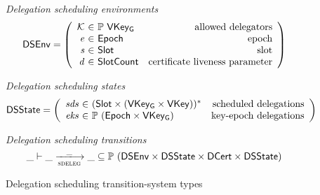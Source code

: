 \begin{figure}[htb]
  \emph{Delegation scheduling environments}
  \begin{equation*}
    \DSEnv =
    \left(
      \begin{array}{r@{~\in~}lr}
        \mathcal{K} & \powerset{\VKeyGen} & \text{allowed delegators}\\
        \var{e} & \Epoch & \text{epoch}\\
        \var{s} & \Slot & \text{slot}\\
        \var{d} & \SlotCount & \text{certificate liveness parameter}
      \end{array}
    \right)
  \end{equation*}

  \emph{Delegation scheduling states}
  \begin{equation*}
    \DSState
    = \left(
      \begin{array}{r@{~\in~}lr}
        \var{sds} & \seqof{(\Slot \times (\VKeyGen \times \VKey))} & \text{scheduled delegations}\\
        \var{eks} & \powerset{(\Epoch \times \VKeyGen)} & \text{key-epoch delegations}
      \end{array}
    \right)
  \end{equation*}

  \emph{Delegation scheduling transitions}
  \begin{equation*}
    \var{\_} \vdash
    \var{\_} \trans{sdeleg}{\_} \var{\_}
    \subseteq \powerset (\DSEnv \times \DSState \times \DCert \times \DSState)
  \end{equation*}
  \caption{Delegation scheduling transition-system types}
  \label{fig:ts-types:delegation-scheduling}
\end{figure}

